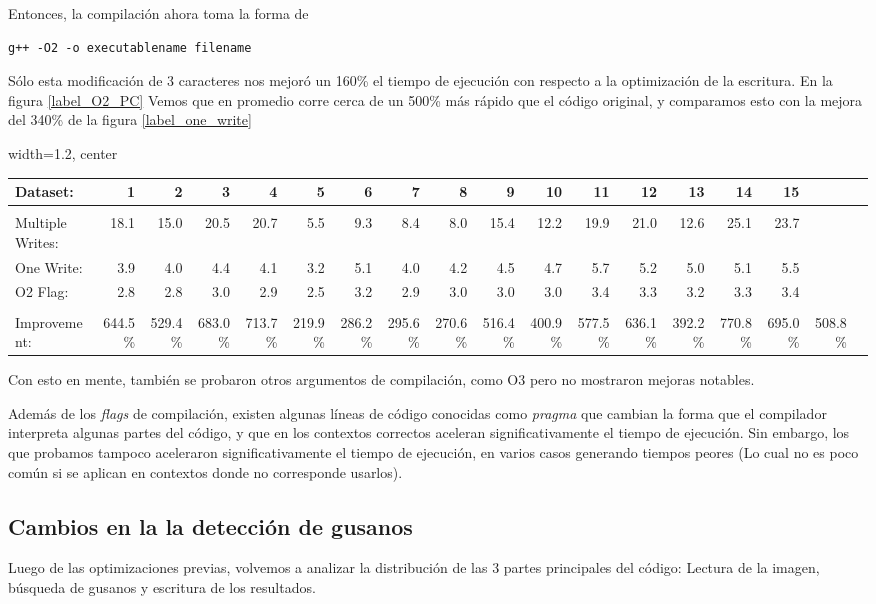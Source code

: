 \documentclass{article}
\begin{document}
Entonces, la compilación ahora toma la forma de 
\begin{lstlisting}
g++ -O2 -o executablename filename
\end{lstlisting}
Sólo esta modificación de 3 caracteres nos mejoró un 160\% el tiempo de ejecución con respecto a la optimización de la escritura. En la figura \ref{label_O2_PC} Vemos que en promedio corre cerca de un 500\% más rápido que el código original, y comparamos esto con la mejora del 340\% de la figura \ref{label_one_write}
\begin{figure*}[h]\centering
\scriptsize
\begin{adjustbox}{width=1.2\textwidth, center}
\begin{tabular}{|l|rrrrrrrrrrrrrrr|r|r|}\toprule
Dataset: &1 &2 &3 &4 &5 &6 &7 &8 &9 &10 &11 &12 &13 &14 &15 & \\
\hline \\
Multiple Writes: &18.1 &15.0 &20.5 &20.7 &5.5 &9.3 &8.4 &8.0 &15.4 &12.2 &19.9 &21.0 &12.6 &25.1 &23.7 & \\
One Write: &3.9 &4.0 &4.4 &4.1 &3.2 &5.1 &4.0 &4.2 &4.5 &4.7 &5.7 &5.2 &5.0 &5.1 &5.5 & \\
O2 Flag: &2.8 &2.8 &3.0 &2.9 &2.5 &3.2 &2.9 &3.0 &3.0 &3.0 &3.4 &3.3 &3.2 &3.3 &3.4 & \\
\hline \\
Improvement: &644.5\% &529.4\% &683.0\% &713.7\% &219.9\% &286.2\% &295.6\% &270.6\% &516.4\% &400.9\% &577.5\% &636.1\% &392.2\% &770.8\% &695.0\% &508.8\% \\
\bottomrule
\end{tabular}
\end{adjustbox}
\caption{Optimización del flag -O2}
\label{label_O2_PC}
\end{figure*}

Con esto en mente, también se probaron otros argumentos de compilación, como O3 pero no mostraron mejoras notables.

Además de los \emph{flags} de compilación, existen algunas líneas de código conocidas como \emph{pragma} que cambian la forma que el compilador interpreta algunas partes del código, y que en los contextos correctos aceleran significativamente el tiempo de ejecución. Sin embargo, los que probamos tampoco aceleraron significativamente el tiempo de ejecución, en varios casos generando tiempos peores (Lo cual no es poco común si se aplican en contextos donde no corresponde usarlos).

\subsection{Cambios en la la detección de gusanos}
Luego de las optimizaciones previas, volvemos a analizar la distribución de las 3 partes principales del código: Lectura de la imagen, búsqueda de gusanos y escritura de los resultados.
\end{document}

